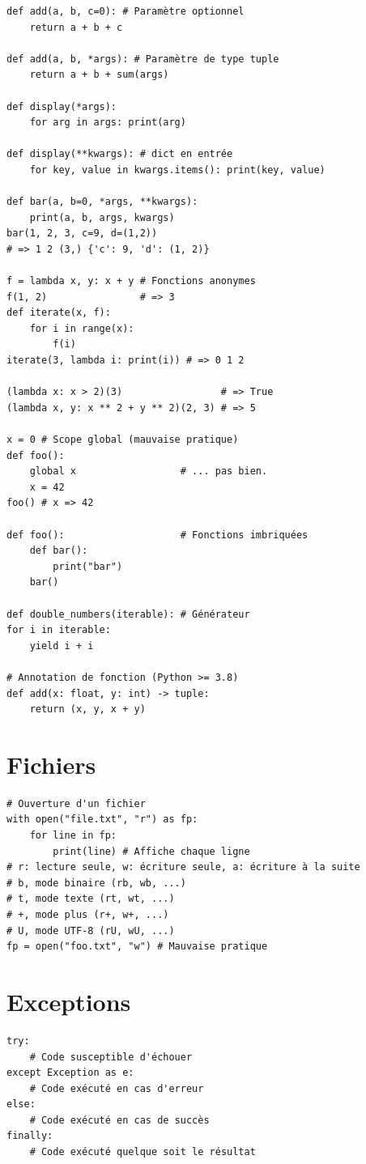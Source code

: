 \documentclass{article}
\begin{document}
\begin{multicols*}{4}
\begin{lstlisting}
def add(a, b, c=0): # Paramètre optionnel
    return a + b + c

def add(a, b, *args): # Paramètre de type tuple
    return a + b + sum(args)

def display(*args): 
    for arg in args: print(arg) 

def display(**kwargs): # dict en entrée
    for key, value in kwargs.items(): print(key, value)

def bar(a, b=0, *args, **kwargs):
    print(a, b, args, kwargs) 
bar(1, 2, 3, c=9, d=(1,2)) 
# => 1 2 (3,) {'c': 9, 'd': (1, 2)}

f = lambda x, y: x + y # Fonctions anonymes
f(1, 2)                # => 3
def iterate(x, f):
    for i in range(x):
        f(i)
iterate(3, lambda i: print(i)) # => 0 1 2

(lambda x: x > 2)(3)                 # => True
(lambda x, y: x ** 2 + y ** 2)(2, 3) # => 5

x = 0 # Scope global (mauvaise pratique)
def foo():
    global x                  # ... pas bien.
    x = 42
foo() # x => 42

def foo():                    # Fonctions imbriquées
    def bar():
        print("bar")
    bar()

def double_numbers(iterable): # Générateur
for i in iterable:
    yield i + i

# Annotation de fonction (Python >= 3.8)
def add(x: float, y: int) -> tuple:
    return (x, y, x + y)
\end{lstlisting}

\section*{Fichiers}
\begin{lstlisting}
# Ouverture d'un fichier
with open("file.txt", "r") as fp:
    for line in fp:
        print(line) # Affiche chaque ligne
# r: lecture seule, w: écriture seule, a: écriture à la suite
# b, mode binaire (rb, wb, ...)
# t, mode texte (rt, wt, ...)
# +, mode plus (r+, w+, ...)
# U, mode UTF-8 (rU, wU, ...)
fp = open("foo.txt", "w") # Mauvaise pratique
\end{lstlisting}

\section*{Exceptions}
\begin{lstlisting}
try: 
    # Code susceptible d'échouer
except Exception as e: 
    # Code exécuté en cas d'erreur
else: 
    # Code exécuté en cas de succès
finally: 
    # Code exécuté quelque soit le résultat
\end{lstlisting}


\end{multicols*}
\end{document}

